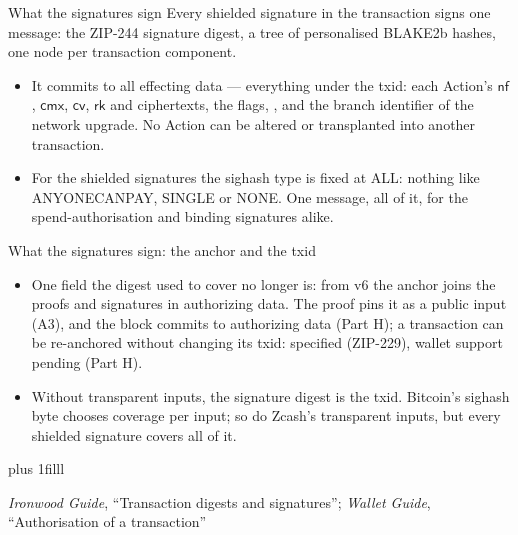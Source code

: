 \documentclass[aspectratio=169,11pt]{beamer}
\newcommand{\nfsym}{\ensuremath{\mathsf{nf}}}
\newcommand{\cmx}{\ensuremath{\mathsf{cmx}}}
\newcommand{\cvsym}{\ensuremath{\mathsf{cv}}}
\newcommand{\rksym}{\ensuremath{\mathsf{rk}}}
\newcommand{\src}[1]{\par\vskip0pt plus 1filll
  {\fontsize{6}{7.2}\selectfont\color{arbdim}\raggedright #1\par}}
\begin{document}
\begin{frame}{What the signatures sign}
Every shielded signature in the transaction signs one message: the
ZIP-244 signature digest, a tree of personalised BLAKE2b hashes, one
node per transaction component.
\begin{itemize}
\item It commits to all effecting data --- everything under the txid:
  each Action's \nfsym, \cmx, \cvsym, \rksym{} and ciphertexts, the
  flags, \Epvbal, and the branch identifier of the network upgrade.
  No Action can be altered or transplanted into another transaction.
\item For the shielded signatures the sighash type is fixed at ALL:
  nothing like ANYONECANPAY, SINGLE or NONE. One message, all of it,
  for the spend-authorisation and binding signatures alike.
\end{itemize}
\end{frame}

\begin{frame}{What the signatures sign: the anchor and the txid}
\begin{itemize}
\item One field the digest used to cover no longer is: from v6 the
  anchor joins the proofs and signatures in authorizing data. The proof
  pins it as a public input (A3), and the block commits to authorizing
  data (Part H); a transaction can be re-anchored without changing its
  txid: specified (ZIP-229), wallet support pending (Part H).
\item Without transparent inputs, the signature digest is the txid.
  Bitcoin's sighash byte chooses coverage per input; so do Zcash's
  transparent inputs, but every shielded signature covers all of it.
\end{itemize}
\src{\emph{Ironwood Guide}, ``Transaction digests and signatures''; \emph{Wallet
  Guide}, ``Authorisation of a transaction''}
\end{frame}
\end{document}

